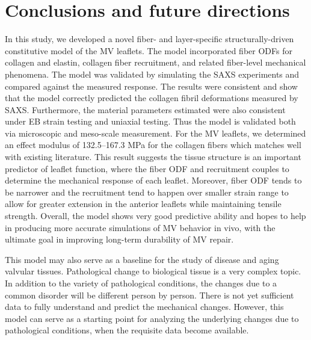\section{Conclusions and future directions}

In this study, we developed a novel fiber- and layer-specific structurally-driven constitutive model of the MV leaflets. The model incorporated fiber ODFs for collagen and elastin, collagen fiber recruitment, and related fiber-level mechanical phenomena. The model was validated by simulating the SAXS experiments and compared against the measured response. The results were consistent and show that the model correctly predicted the collagen fibril deformations measured by SAXS. Furthermore, the material parameters estimated were also consistent under EB strain testing and uniaxial testing. Thus the model is validated both via microscopic and meso-scale measurement. For the MV leaflets, we determined an effect modulus of 132.5–167.3 MPa for the collagen fibers which matches well with existing literature. This result suggests the tissue structure is an important predictor of leaflet function, where the fiber ODF and recruitment couples to determine the mechanical response of each leaflet. Moreover, fiber ODF tends to be narrower and the recruitment tend to happen over smaller strain range to allow for greater extension in the anterior leaflets while maintaining tensile strength. Overall, the model shows very good predictive ability and hopes to help in producing more accurate simulations of MV behavior in vivo, with the ultimate goal in improving long-term durability of MV repair.

This model may also serve as a baseline for the study of disease and aging valvular tissues. Pathological change to biological tissue is a very complex topic. In addition to the variety of pathological conditions, the changes due to a common disorder will be different person by person. There is not yet sufficient data to fully understand and predict the mechanical changes. However, this model can serve as a starting point for analyzing the underlying changes due to pathological conditions, when the requisite data become available.

